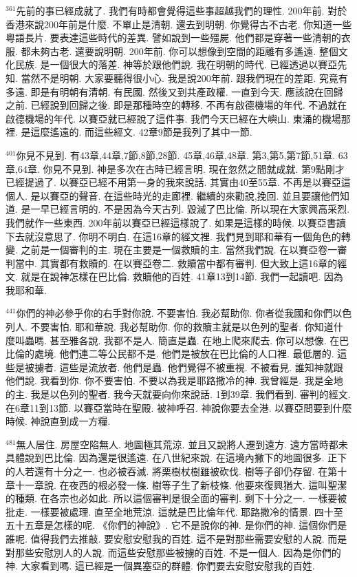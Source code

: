 \documentclass{book}
\begin{document}
$^{361}$先前的事已經成就了.
我們有時都會覺得這些事超越我們的理性.
200年前.
對於香港來說200年前是什麼.
不單止是清朝.
還去到明朝.
你覺得古不古老.
你知道一些粵語長片.
要表達這些時代的差異.
譬如說到一些殭屍.
他們都是穿著一些清朝的衣服.
都未夠古老.
還要說明朝.
200年前.
你可以想像到空間的距離有多遙遠.
整個文化民族.
是一個很大的落差.
神等於跟他們說.
我在明朝的時代.
已經透過以賽亞先知.
當然不是明朝.
大家要聽得很小心.
我是說200年前.
跟我們現在的差距.
究竟有多遠.
即是有明朝有清朝.
有民國.
然後又到共產政權.
一直到今天.
應該說在回歸之前.
已經說到回歸之後.
即是那種時空的轉移.
不再有啟德機場的年代.
不過就在啟德機場的年代.
以賽亞就已經說了這件事.
我們今天已經在大嶼山.
東涌的機場那裡.
是這麼遙遠的.
而這些經文.
42章9節是我列了其中一節.

$^{401}$你見不見到.
有43章,44章,7節,8節,28節.
45章,46章,48章.
第3,第5,第7節,51章.
63章,64章.
你見不見到.
神是多次在古時已經言明.
現在忽然之間就成就.
第9點剛才已經提過了.
以賽亞已經不用第一身的我來說話.
其實由40至55章.
不再是以賽亞這個人.
是以賽亞的聲音.
在這些時光的走廊裡.
繼續的來勸說,挽回.
並且要讓他們知道.
是一早已經言明的.
不是因為今天古列.
毀滅了巴比倫.
所以現在大家興高采烈.
我們就作一些東西.
200年前以賽亞已經這樣說了.
如果是這樣的時候.
以賽亞書讀下去就沒意思了.
你明不明白.
在這16章的經文裡.
我們見到耶和華有一個角色的轉變.
之前是一個審判的主.
現在主要是一個救贖的主.
當然我們說.
在以賽亞卷一審判當中.
其實都有救贖的.
在以賽亞卷二.
救贖當中都有審判.
但大致上這16章的經文.
就是在說神怎樣在巴比倫.
救贖他的百姓.
41章13到14節.
我們一起讀吧.
因為我耶和華.

$^{441}$你們的神必參乎你的右手對你說.
不要害怕.
我必幫助你.
你者從我國和你們以色列人.
不要害怕.
耶和華說.
我必幫助你.
你的救贖主就是以色列的聖者.
你知道什麼叫蟲嗎.
甚至雅各說.
我都不是人.
簡直是蟲.
在地上爬來爬去.
你可以想像.
在巴比倫的處境.
他們連二等公民都不是.
他們是被放在巴比倫的人口裡.
最低層的.
這些是被擄者.
這些是流放者.
他們是蟲.
他們覺得不被重視.
不被看見.
誰知神就跟他們說.
我看到你.
你不要害怕.
不要以為我是耶路撒冷的神.
我曾經是.
我是全地的主.
我是以色列的聖者.
我今天就要向你來說話.
1到39章.
我們看到.
審判的經文.
在6章11到13節.
以賽亞當時在聖殿.
被神呼召.
神說你要去全港.
以賽亞問要到什麼時候.
神說直到成一方糧.

$^{481}$無人居住.
房屋空陷無人.
地圖極其荒涼.
並且又說將人遷到遠方.
遠方當時都未具體說到巴比倫.
因為還是很遙遠.
在八世紀來說.
在這境內撇下的地圖很多.
正下的人若還有十分之一.
也必被吞滅.
將栗樹杖樹雖被砍伐.
樹等子卻仍存留.
在第十章十一章說.
在夜西的根必發一條.
樹等子生了新枝條.
他要來復興猶大.
這叫聖潔的種類.
在各宗也必如此.
所以這個審判是很全面的審判.
剩下十分之一.
一樣要被批走.
一樣要被處理.
直至全地荒涼.
這就是巴比倫年代.
耶路撒冷的情景.
四十至五十五章是怎樣的呢.
《你們的神說》.
它不是說你的神.
是你們的神.
這個你們是誰呢.
值得我們去推敲.
要安慰安慰我的百姓.
這不是對那些需要安慰的人說.
而是對那些安慰別人的人說.
而這些安慰那些被擄的百姓.
不是一個人.
因為是你們的神.
大家看到嗎.
這已經是一個異塞亞的群體.
你們要去安慰安慰我的百姓.
\end{document}
